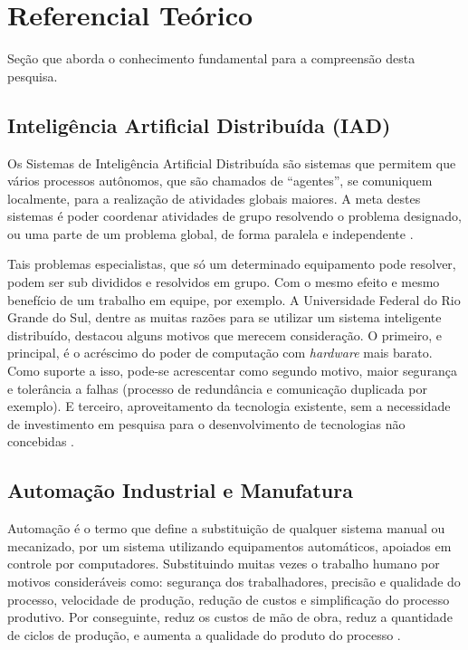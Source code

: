 \documentclass[
	article,			    %
	12pt,				    %
	oneside,			    %
	a4paper,			    %
	chapter=TITLE,		    %
	section=TITLE,		    %
	subsection=TITLE,	    %
	english,			    %
	brazil,				    %
	sumario=tradicional
]{abntex2}
\begin{document}
\section{Referencial Teórico}
Seção que aborda o conhecimento fundamental para a compreensão desta pesquisa.
\subsection{Inteligência Artificial Distribuída (IAD)}
Os Sistemas de Inteligência Artificial Distribuída são sistemas que permitem que vários processos autônomos, que são chamados de ``agentes'', se comuniquem localmente, para a realização de atividades globais maiores. A meta destes sistemas é poder coordenar atividades de grupo resolvendo o problema designado, ou uma parte de um problema global, de forma paralela e independente \cite{ufrgsiad}.

Tais problemas especialistas, que só um determinado equipamento pode resolver, podem ser sub divididos e resolvidos em grupo. Com o mesmo efeito e mesmo benefício de um trabalho em equipe, por exemplo. A Universidade Federal do Rio Grande do Sul, dentre as muitas razões para se utilizar um sistema inteligente distribuído, destacou alguns motivos que merecem consideração. O primeiro, e principal, é o acréscimo do poder de computação com \emph{hardware} mais barato. Como suporte a isso, pode-se acrescentar como segundo motivo, maior segurança e tolerância a falhas (processo de redundância e comunicação duplicada por exemplo). E terceiro, aproveitamento da tecnologia existente, sem a necessidade de investimento em pesquisa para o desenvolvimento de tecnologias não concebidas \cite{ufrgsiad}. 

\subsection{Automação Industrial e Manufatura}
Automação é o termo que define a substituição de qualquer sistema manual ou mecanizado, por um sistema utilizando equipamentos automáticos, apoiados em controle por computadores. Substituindo muitas vezes o trabalho humano por motivos consideráveis como: segurança dos trabalhadores, precisão e qualidade do processo, velocidade de produção, redução de custos e simplificação do processo produtivo. Por conseguinte, reduz os custos de mão de obra, reduz a quantidade de ciclos de produção, e aumenta a qualidade do produto do processo \cite{groover2011automacao}.
\end{document}
